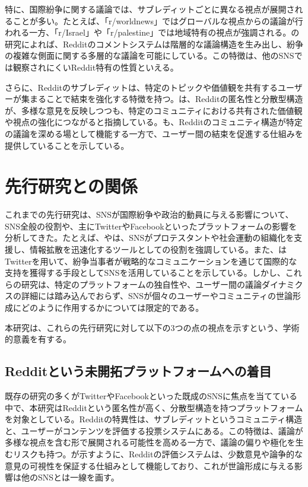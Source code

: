\documentclass[11pt, a4j]{jreport}
\begin{document}
    特に、国際紛争に関する議論では、サブレディットごとに異なる視点が展開されることが多い。たとえば、「r/worldnews」ではグローバルな視点からの議論が行われる一方、「r/Israel」や「r/palestine」では地域特有の視点が強調される。\citet{gaffney2018caveat}の研究によれば、Redditのコメントシステムは階層的な議論構造を生み出し、紛争の複雑な側面に関する多層的な議論を可能にしている。この特徴は、他のSNSでは観察されにくいReddit特有の性質といえる。

    さらに、Redditのサブレディットは、特定のトピックや価値観を共有するユーザーが集まることで結束を強化する特徴を持つ。\citet{massanari2015participatory}は、Redditの匿名性と分散型構造が、多様な意見を反映しつつも、特定のコミュニティにおける共有された価値観や視点の強化につながると指摘している。\citet{gaffney2018caveat}も、Redditのコミュニティ構造が特定の議論を深める場として機能する一方で、ユーザー間の結束を促進する仕組みを提供していることを示している。

    \section{先行研究との関係}
    これまでの先行研究は、SNSが国際紛争や政治的動員に与える影響について、SNS全般の役割や、主にTwitterやFacebookといったプラットフォームの影響を分析してきた。たとえば、\citet{shirky2011}や\citet{hussain2013democracy}は、SNSがプロテスタントや社会運動の組織化を支援し、情報拡散を迅速化するツールとしての役割を強調している。また、\citet{zeitzoff2017}はTwitterを用いて、紛争当事者が戦略的なコミュニケーションを通じて国際的な支持を獲得する手段としてSNSを活用していることを示している。しかし、これらの研究は、特定のプラットフォームの独自性や、ユーザー間の議論ダイナミクスの詳細には踏み込んでおらず、SNSが個々のユーザーやコミュニティの世論形成にどのように作用するかについては限定的である。

    本研究は、これらの先行研究に対して以下の3つの点の視点を示すという、学術的意義を有する。

    \subsection{Redditという未開拓プラットフォームへの着目}
    既存の研究の多くがTwitterやFacebookといった既成のSNSに焦点を当てている中で、本研究はRedditという匿名性が高く、分散型構造を持つプラットフォームを対象としている。Redditの特異性は、サブレディットというコミュニティ構造と、ユーザーがコンテンツを評価する投票システムにある。この特徴は、議論が多様な視点を含む形で展開される可能性を高める一方で、議論の偏りや極化を生むリスクも持つ。\citet{massanari2015participatory}が示すように、Redditの評価システムは、少数意見や論争的な意見の可視性を保証する仕組みとして機能しており、これが世論形成に与える影響は他のSNSとは一線を画す。
\end{document}
